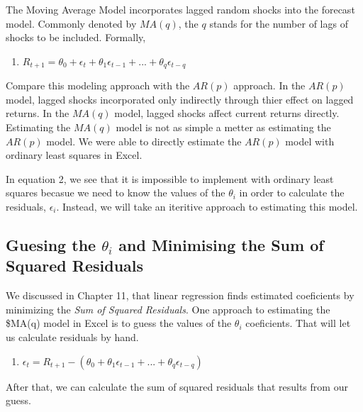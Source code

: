 \documentclass[
]{book}
\providecommand{\tightlist}{%
  \setlength{\itemsep}{0pt}\setlength{\parskip}{0pt}}
\begin{document}
The Moving Average Model incorporates lagged random shocks into the forecast model. Commonly denoted by \(MA(q)\), the \(q\) stands for the number of lags of shocks to be included. Formally,

\begin{enumerate}
\def\labelenumi{\arabic{enumi}.}
\setcounter{enumi}{1}
\tightlist
\item
  \(R_{t+1} = \theta_0 + \epsilon_t + \theta_1\epsilon_{t-1} + ... + \theta_q\epsilon_{t-q}\)
\end{enumerate}

Compare this modeling approach with the \(AR(p)\) approach. In the \(AR(p)\) model, lagged shocks incorporated only indirectly through thier effect on lagged returns. In the \(MA(q)\) model, lagged shocks affect current returns directly. Estimating the \(MA(q)\) model is not as simple a metter as estimating the \(AR(p)\) model. We were able to directly estimate the \(AR(p)\) model with ordinary least squares in Excel.

In equation 2, we see that it is impossible to implement with ordinary least squares becasue we need to know the values of the \(\theta_i\) in order to calculate the residuals, \(\epsilon_i\). Instead, we will take an iteritive approach to estimating this model.

\hypertarget{guesing-the-theta_i-and-minimising-the-sum-of-squared-residuals}{%
\subsection{\texorpdfstring{Guesing the \(\theta_i\) and Minimising the Sum of Squared Residuals}{Guesing the \textbackslash theta\_i and Minimising the Sum of Squared Residuals}}\label{guesing-the-theta_i-and-minimising-the-sum-of-squared-residuals}}

We discussed in Chapter 11, that linear regression finds estimated coeficients by minimizing the \emph{Sum of Squared Residuals}. One approach to estimating the \$MA(q) model in Excel is to guess the values of the \(\theta_i\) coeficients. That will let us calculate residuals by hand.

\begin{enumerate}
\def\labelenumi{\arabic{enumi}.}
\setcounter{enumi}{2}
\tightlist
\item
  \(\epsilon_{t} = R_{t+1} - (\theta_0 + \theta_1\epsilon_{t-1} + ... + \theta_q\epsilon_{t-q})\)
\end{enumerate}

After that, we can calculate the sum of squared residuals that results from our guess.
\end{document}
